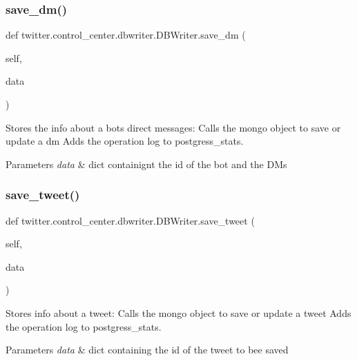 \subsubsection{\texorpdfstring{save\+\_\+dm()}{save\_dm()}}
{\footnotesize\ttfamily def twitter.\+control\+\_\+center.\+dbwriter.\+D\+B\+Writer.\+save\+\_\+dm (\begin{DoxyParamCaption}\item[{}]{self,  }\item[{}]{data }\end{DoxyParamCaption})}



Stores the info about a bot\textquotesingle{}s direct messages\+: Calls the mongo object to save or update a dm Adds the operation log to postgress\+\_\+stats. 


\begin{DoxyParams}{Parameters}
{\em data} & dict containignt the id of the bot and the D\+Ms \\
\hline
\end{DoxyParams}
\mbox{\label{classtwitter_1_1control__center_1_1dbwriter_1_1DBWriter_a0596d9924189129c588b6c603f462d5b}} 
\subsubsection{\texorpdfstring{save\+\_\+tweet()}{save\_tweet()}}
{\footnotesize\ttfamily def twitter.\+control\+\_\+center.\+dbwriter.\+D\+B\+Writer.\+save\+\_\+tweet (\begin{DoxyParamCaption}\item[{}]{self,  }\item[{}]{data }\end{DoxyParamCaption})}



Stores info about a tweet\+: Calls the mongo object to save or update a tweet Adds the operation log to postgress\+\_\+stats. 


\begin{DoxyParams}{Parameters}
{\em data} & dict containing the id of the tweet to bee saved \\
\hline
\end{DoxyParams}
\mbox{\label{classtwitter_1_1control__center_1_1dbwriter_1_1DBWriter_a38708a33bd2b8019383571275b8a0f17}} 
